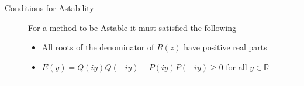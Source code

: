\documentclass[letterpaper,10pt,english]{jupyterBook}
\begin{document}
\begin{description}
\item[{Conditions for A\sphinxhyphen{}stability\label{\detokenize{8_Appendices/8.0_Cheat_sheet:term-Conditions-for-A-stability}}}] \leavevmode
\sphinxAtStartPar
For a method to be A\sphinxhyphen{}stable it must satisfied the following {\hyperref[\detokenize{4_Stability/4.3_IRK_stability_function:a-stability-theorem}]{}}
\begin{itemize}
\item {} 
\sphinxAtStartPar
All roots of the denominator of \(R(z)\) have positive real parts

\item {} 
\sphinxAtStartPar
\(E(y)=Q(iy)Q(-iy)-P(iy)P(-iy) \geq 0\) for all \(y\in \mathbb{R}\)

\end{itemize}

\end{description}


\bigskip\hrule\bigskip
\end{document}
